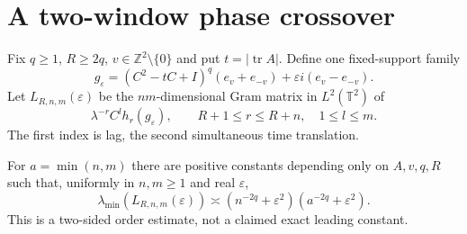 \section{A two-window phase crossover}
\label{sec:two-window-crossover}
Fix $q\ge1$, $R\ge2q$, $v\in\mathbb Z^2\setminus\{0\}$ and put
$t=|\operatorname{tr}A|$. Define one fixed-support family
\[
 g_\varepsilon=(C^2-tC+I)^q(e_v+e_{-v})
                         +\varepsilon i(e_v-e_{-v}).
\]
Let $L_{R,n,m}(\varepsilon)$ be the $nm$-dimensional Gram matrix in
$L^2(\mathbb T^2)$ of
\[
 \lambda^{-r}C^lh_r(g_\varepsilon),\qquad
 R+1\le r\le R+n,\quad 1\le l\le m.
\]
The first index is lag, the second simultaneous time translation.

\begin{theorem}\label{thm:two-window-edge}
For $a=\min(n,m)$ there are positive constants depending only on
$A,v,q,R$ such that, uniformly in $n,m\ge1$ and real $\varepsilon$,
\[
 \lambda_{\min}(L_{R,n,m}(\varepsilon))
 \asymp (n^{-2q}+\varepsilon^2)(a^{-2q}+\varepsilon^2).
\]
This is a two-sided order estimate, not a claimed exact leading constant.
\end{theorem}
